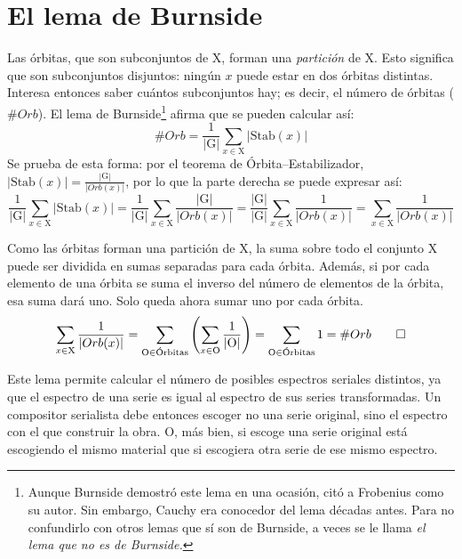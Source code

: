 	\section{El lema de Burnside}
		\label{burnside}
		Las órbitas, que son subconjuntos de X, forman una \emph{partición} de X. Esto significa que son subconjuntos disjuntos: ningún $x$ puede estar en dos órbitas distintas. Interesa entonces saber cuántos subconjuntos hay; es decir, el número de órbitas ($\#Orb$). El lema de Burnside\footnote{Aunque Burnside demostró este lema en una ocasión, citó a Frobenius como su autor. Sin embargo, Cauchy era conocedor del lema décadas antes. Para no confundirlo con otros lemas que sí son de Burnside, a veces se le llama \emph{el lema que no es de Burnside.}} afirma que se pueden calcular así:
		\[\#Orb=\frac{1}{|\text{G}|}\sum_{x\in\text{X}}|\text{Stab}(x)|\]	
		Se prueba de esta forma: por el teorema de Órbita--Estabilizador, $|\text{Stab}(x)|=\frac{|\text{G}|}{|Orb(x)|}$, por lo que la parte derecha se puede expresar así:
		\[\frac{1}{|\text{G}|}\sum_{x\in\text{X}}|\text{Stab}(x)|=\frac{1}{|\text{G}|}\sum_{x\in\text{X}}\frac{|\text{G}|}{|Orb(x)|}=\frac{|\text{G}|}{|\text{G}|}\sum_{x\in\text{X}}\frac{1}{|Orb(x)|}=\sum_{x\in\text{X}}\frac{1}{|Orb(x)|}\]

		Como las órbitas forman una partición de X, la suma sobre todo el conjunto X puede ser dividida en sumas separadas para cada órbita. Además, si por cada elemento de una órbita se suma el inverso del número de elementos de la órbita, esa suma dará uno. Solo queda ahora sumar uno por cada órbita.
		\[\sum_{x\in\text{X}}\frac{1}{|Orb(x)|}=\sum_{\text{O}\in\text{Órbitas}}\left(\sum_{x\in\text{O}}\frac{1}{|\text{O}|}\right)=\sum_{\text{O}\in\text{Órbitas}}1=\#Orb \qed\]	
	
		Este lema permite calcular el número de posibles espectros seriales distintos, ya que el espectro de una serie es igual al espectro de sus series transformadas. Un compositor serialista debe entonces escoger no una serie original, sino el espectro con el que construir la obra. O, más bien, si escoge una serie original está escogiendo el mismo material que si escogiera otra serie de ese mismo espectro.
